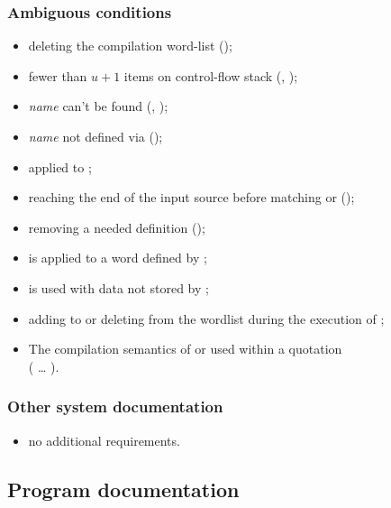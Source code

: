 \subsubsection{Ambiguous conditions} %
\label{tools:ambiguous}

\begin{itemize}
\item deleting the compilation word-list ();
\item fewer than $u+1$ items on control-flow stack
	(,
	 );
\item \emph{name} can't be found (, );
\item \emph{name} not defined via 
	();
\item {} applied to ;
\item reaching the end of the input source before matching
	 or 
	();
\item removing a needed definition ();
\item {} is applied to a word defined by ;
\item {} is used with data not stored by ;
\item adding to or deleting from the wordlist during the execution of
	;
\item The compilation semantics of  or  used within
	a quotation \\(\word{[:} {\ldots} \word{;]}).
\end{itemize}

\subsubsection{Other system documentation} %

\begin{itemize}
\item no additional requirements.
\end{itemize}

\subsection{Program documentation} %

